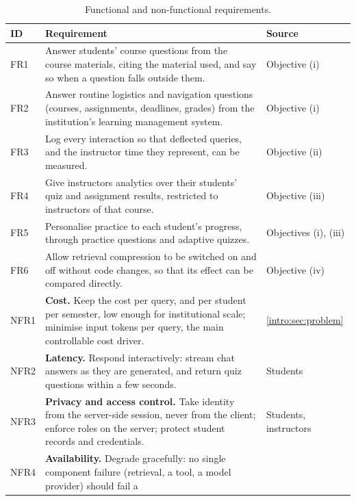 \begin{table}[htb]
  \centering
  \caption{Functional and non-functional requirements.}
  \label{design:tab:requirements}
  \footnotesize
  \renewcommand{\arraystretch}{1.25}
  \begin{tabular}{l L{0.62\textwidth} L{0.17\textwidth}}
    \hline
    \textbf{ID} & \textbf{Requirement} & \textbf{Source} \\
    \hline
    FR1 & Answer students' course questions from the course materials,
          citing the material used, and say so when a question falls outside
          them. & Objective (i) \\
    FR2 & Answer routine logistics and navigation questions (courses,
          assignments, deadlines, grades) from the institution's learning
          management system. & Objective (i) \\
    FR3 & Log every interaction so that deflected queries, and the
          instructor time they represent, can be measured. & Objective (ii) \\
    FR4 & Give instructors analytics over their students' quiz and
          assignment results, restricted to instructors of that course. & Objective (iii) \\
    FR5 & Personalise practice to each student's progress, through practice
          questions and adaptive quizzes. & Objectives (i), (iii) \\
    FR6 & Allow retrieval compression to be switched on and off without code
          changes, so that its effect can be compared directly. &
          Objective (iv) \\
    \hline
    NFR1 & \textbf{Cost.} Keep the cost per query, and per student per
           semester, low enough for institutional scale; minimise input
           tokens per query, the main controllable cost driver. &
           \autoref{intro:sec:problem} \\
    NFR2 & \textbf{Latency.} Respond interactively: stream chat answers as
           they are generated, and return quiz questions within a few
           seconds. & Students \\
    NFR3 & \textbf{Privacy and access control.} Take identity from the
           server-side session, never from the client; enforce roles on the
           server; protect student records and credentials. & Students,
           instructors \\
    NFR4 & \textbf{Availability.} Degrade gracefully: no single component
           failure (retrieval, a tool, a model provider) should fail a

\end{tabular}
\end{table}
